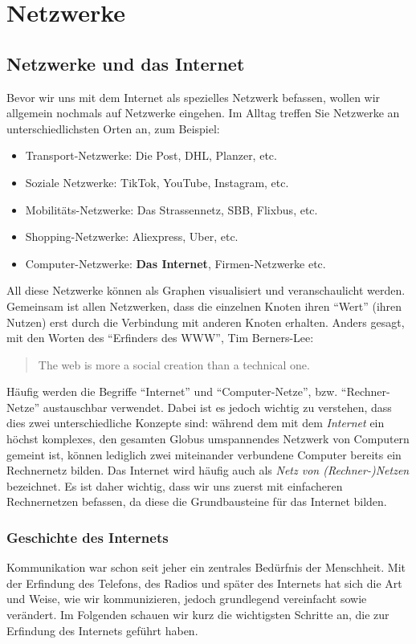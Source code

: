 \chapter{Netzwerke}

\section{Netzwerke und das Internet}
Bevor wir uns mit dem Internet als spezielles Netzwerk befassen, wollen wir allgemein nochmals auf Netzwerke eingehen. Im Alltag treffen Sie Netzwerke an unterschiedlichsten Orten an, zum Beispiel:
\begin{itemize}
	\item Transport-Netzwerke: Die Post, DHL, Planzer, etc.
	\item Soziale Netzwerke: TikTok, YouTube, Instagram, etc.
	\item Mobilitäts-Netzwerke: Das Strassennetz, SBB, Flixbus, etc.
	\item Shopping-Netzwerke: Aliexpress, Uber, etc.
	\item Computer-Netzwerke: \textbf{Das Internet}, Firmen-Netzwerke etc.
\end{itemize}

All diese Netzwerke können als Graphen visualisiert und veranschaulicht werden. Gemeinsam ist allen Netzwerken, dass die einzelnen Knoten ihren \enquote{Wert} (ihren Nutzen) erst durch die Verbindung mit anderen Knoten erhalten. Anders gesagt, mit den Worten des \enquote{Erfinders des \gls{WWW}}, Tim Berners-Lee:

\begin{quotation}
	The web is more a social creation than a technical one.
\end{quotation}

Häufig werden die Begriffe \enquote{Internet} und \enquote{Computer-Netze}, bzw. \enquote{Rechner-Netze} austauschbar verwendet. Dabei ist es jedoch wichtig zu verstehen, dass dies zwei unterschiedliche Konzepte sind: während dem mit dem \textit{Internet} ein höchst komplexes, den gesamten Globus umspannendes Netzwerk von Computern gemeint ist, können lediglich zwei miteinander verbundene Computer bereits ein Rechnernetz bilden. Das Internet wird häufig auch als \textit{Netz von (Rechner-)Netzen} bezeichnet. Es ist daher wichtig, dass wir uns zuerst mit einfacheren Rechnernetzen befassen, da diese die Grundbausteine für das Internet bilden.

\subsection{Geschichte des Internets}
Kommunikation war schon seit jeher ein zentrales Bedürfnis der Menschheit. Mit der Erfindung des Telefons, des Radios und später des Internets hat sich die Art und Weise, wie wir kommunizieren, jedoch grundlegend vereinfacht sowie verändert. Im Folgenden schauen wir kurz die wichtigsten Schritte an, die zur Erfindung des Internets geführt haben.

